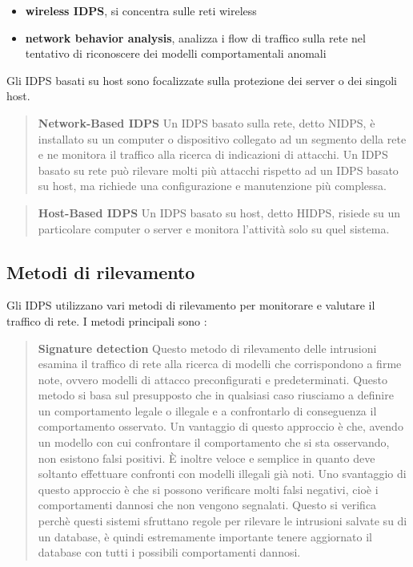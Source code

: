 \documentclass[../main.tex]{subfiles}
\begin{document}
\begin{itemize}
				\item \textbf{wireless IDPS}, si concentra sulle reti wireless
				\item \textbf{network behavior analysis}, analizza i flow di traffico sulla rete nel tentativo di riconoscere dei modelli comportamentali anomali
\end{itemize}

Gli IDPS basati su host sono focalizzate sulla protezione dei server o dei singoli host.

\begin{verse}
				\textbf{Network-Based IDPS} Un IDPS basato sulla rete, detto NIDPS, è installato su un computer o dispositivo collegato ad un segmento della rete e ne monitora il traffico alla ricerca di indicazioni di attacchi. Un IDPS basato su rete può rilevare molti più attacchi rispetto ad un IDPS basato su host, ma richiede una configurazione e manutenzione più complessa. 
\end{verse}

\begin{verse}
				\textbf{Host-Based IDPS} Un IDPS basato su host, detto HIDPS, risiede su un particolare computer o server e monitora l'attività solo su quel sistema.
\end{verse}

\subsection{Metodi di rilevamento}

Gli IDPS utilizzano vari metodi di rilevamento per monitorare e valutare il traffico di rete. I metodi principali sono \cite{IDS}:

\begin{verse}
				\textbf{Signature detection} Questo metodo di rilevamento delle intrusioni esamina il traffico di rete alla ricerca di modelli che corrispondono a firme note, ovvero modelli di attacco preconfigurati e predeterminati. Questo metodo si basa sul presupposto che in qualsiasi caso riusciamo a definire un comportamento legale o illegale e a confrontarlo di conseguenza il comportamento osservato.
				Un vantaggio di questo approccio è che, avendo un modello con cui confrontare il comportamento che si sta osservando, non esistono falsi positivi. È inoltre veloce e semplice in quanto deve soltanto effettuare confronti con modelli illegali già noti.
				Uno svantaggio di questo approccio è che si possono verificare molti falsi negativi, cioè i comportamenti dannosi che non vengono segnalati. Questo si verifica perchè questi sistemi sfruttano regole per rilevare le intrusioni salvate su di un database, è quindi estremamente importante tenere aggiornato il database con tutti i possibili comportamenti dannosi.
\end{verse}
\end{document}
